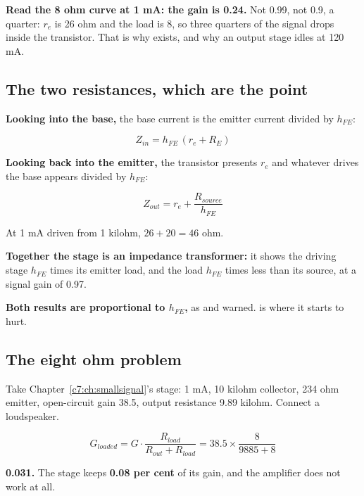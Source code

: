 
\textbf{Read the 8 ohm curve at 1 mA: the gain is 0.24.} Not 0.99, not 0.9, a quarter: $r_e$ is 26 ohm and the load is 8, so three quarters of the signal drops inside the transistor. That is why  exists, and why an output stage idles at 120 mA.

\subsection{The two resistances, which are the point}
\label{c8:sec:a3}
\textbf{Looking into the base,} the base current is the emitter current divided by $h_{FE}$:

\[
  Z_{in} = h_{FE}\,(r_e + R_E)
\]

\textbf{Looking back into the emitter,} the transistor presents $r_e$ and whatever drives the base appears divided by $h_{FE}$:

\[
  Z_{out} = r_e + \frac{R_{source}}{h_{FE}}
\]

At 1 mA driven from 1 kilohm, $26 + 20 = 46$ ohm.

\textbf{Together the stage is an impedance transformer:} it shows the driving stage $h_{FE}$ times its emitter load, and the load $h_{FE}$ times less than its source, at a signal gain of 0.97.

\textbf{Both results are proportional to $h_{FE}$,} as  and  warned.  is where it starts to hurt.

\subsection{The eight ohm problem}
\label{c8:sec:a4}
Take Chapter~\ref{c7:ch:smallsignal}'s stage: 1 mA, 10 kilohm collector, 234 ohm emitter, open-circuit gain 38.5, output resistance 9.89 kilohm. Connect a loudspeaker.

\[
  G_{loaded} = G \cdot \frac{R_{load}}{R_{out} + R_{load}} = 38.5 \times \frac{8}{9885 + 8}
\]

\textbf{0.031.} The stage keeps \textbf{0.08 per cent} of its gain, and the amplifier does not work at all.

